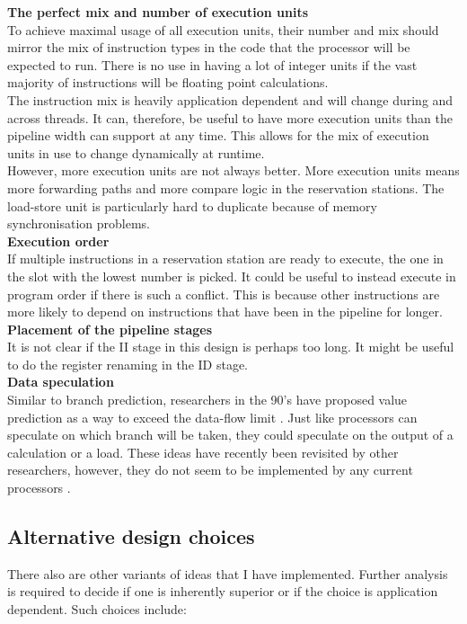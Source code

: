 \documentclass[12pt,a4paper]{article} %
\begin{document}
\textbf{The perfect mix and number of execution units}\\ 
	To achieve maximal usage of all execution units, their number and mix should mirror the mix of instruction types in the code that the processor will be expected to run. There is no use in having a lot of integer units if the vast majority of instructions will be floating point calculations.\\
	The instruction mix is heavily application dependent and will change during and across threads. It can, therefore, be useful to have more execution units than the pipeline width can support at any time. This allows for the mix of execution units in use to change dynamically at runtime.\\
	However, more execution units are not always better. More execution units means more forwarding paths and more compare logic in the reservation stations. The load-store unit is particularly hard to duplicate because of memory synchronisation problems. \cite[p.~205f]{lipastiShen} \\	

\textbf{Execution order}\\
	If multiple instructions in a reservation station are ready to execute, the one in the slot with the lowest number is picked. It could be useful to instead execute in program order if there is such a conflict. This is because other instructions are more likely to depend on instructions that have been in the pipeline for longer.\\
	
\textbf{Placement of the pipeline stages}\\
	It is not clear if the II stage in this design is perhaps too long. It might be useful to do the register renaming in the ID stage.\\		
	
\textbf{Data speculation}\\
	Similar to branch prediction, researchers in the 90's have proposed value prediction as a way to exceed the data-flow limit \cite[p.~261f]{lipastiShen}. Just like processors can speculate on which branch will be taken, they could speculate on the output of a calculation or a load. These ideas have recently been revisited by other researchers, however, they do not seem to be implemented by any current processors \cite{valuePrediction}.


\subsection{Alternative design choices}
There also are other variants of ideas that I have implemented. Further analysis is required to decide if one is inherently superior or if the choice is application dependent. Such choices include:\\
\end{document}
